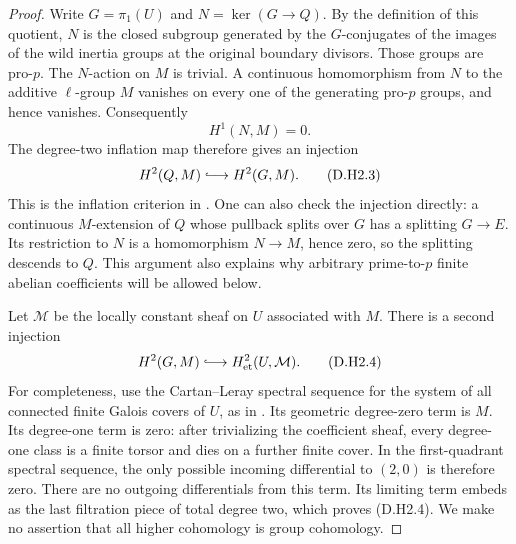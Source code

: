 \begin{proof}
Write $G=\pi_1(U)$ and $N=\ker(G\to Q)$.  By the definition of
this quotient, $N$ is the closed subgroup generated by the
$G$-conjugates of the images of the wild inertia groups at the
original boundary divisors.  Those groups are pro-$p$.
The $N$-action on $M$ is trivial.  A continuous homomorphism
from $N$ to the additive $\ell$-group $M$ vanishes on every
one of the generating pro-$p$ groups, and hence vanishes.
Consequently
\[
                        H^1(N,M)=0.
\]
The degree-two inflation map therefore gives an injection
\[
                H^2(Q,M)\lhook\joinrel\longrightarrow H^2(G,M).
                                                        \tag{D.H2.3}
\]
This is the inflation criterion in
\citep[II, Proposition~1.34 and Remark~1.35, pp.~71--72;
continuous cochains in II, Proposition~4.2, p.~87]{MilneCFT2020D}.
One can also check the injection directly: a continuous
$M$-extension of $Q$ whose pullback splits over $G$ has a
splitting $G\to E$.  Its restriction to $N$ is a homomorphism
$N\to M$, hence zero, so the splitting descends to $Q$.
This argument also explains why arbitrary prime-to-$p$
finite abelian coefficients will be allowed below.

Let $\mathcal M$ be the locally constant sheaf on $U$
associated with $M$.  There is a second injection
\[
              H^2(G,M)\lhook\joinrel\longrightarrow
                        H^2_{\mathrm{et}}(U,\mathcal M).
                                                        \tag{D.H2.4}
\]
For completeness, use the Cartan--Leray spectral sequence
for the system of all connected finite Galois covers of
$U$, as in \citep[Theorem~14.9, Remark~14.10 and
Proposition~14.13, pp.~96--98]{MilneLEC2013H2D}.
Its geometric degree-zero term is $M$.  Its degree-one
term is zero: after trivializing the coefficient sheaf,
every degree-one class is a finite torsor and dies on a
further finite cover.  In the first-quadrant spectral
sequence, the only possible incoming differential to
$(2,0)$ is therefore zero.  There are no outgoing
differentials from this term.  Its limiting term embeds
as the last filtration piece of total degree two,
which proves (D.H2.4).  We make no assertion that all
higher cohomology is group cohomology.


\end{proof}
